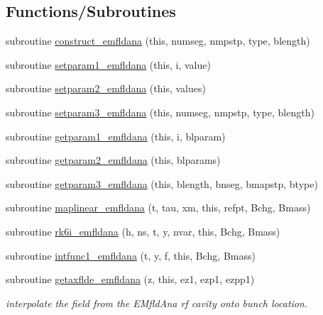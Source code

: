 \subsection*{Functions/\+Subroutines}
\begin{DoxyCompactItemize}
\item 
subroutine \mbox{\hyperlink{namespaceemfldanaclass_a56809546255dc4d8ef545de43f8ced80}{construct\+\_\+emfldana}} (this, numseg, nmpstp, type, blength)
\item 
subroutine \mbox{\hyperlink{namespaceemfldanaclass_acef322ec41908ed27c9dc0f7fe9f4c1c}{setparam1\+\_\+emfldana}} (this, i, value)
\item 
subroutine \mbox{\hyperlink{namespaceemfldanaclass_aac0a3936b2e95e4a86fee5277907646e}{setparam2\+\_\+emfldana}} (this, values)
\item 
subroutine \mbox{\hyperlink{namespaceemfldanaclass_aad90f0dd7002f12e7a5ba004dfb37635}{setparam3\+\_\+emfldana}} (this, numseg, nmpstp, type, blength)
\item 
subroutine \mbox{\hyperlink{namespaceemfldanaclass_ae345ffd1b3393ca091f8cdf3409e3088}{getparam1\+\_\+emfldana}} (this, i, blparam)
\item 
subroutine \mbox{\hyperlink{namespaceemfldanaclass_ae0015cdb617a1920e47dbc2274fb77b2}{getparam2\+\_\+emfldana}} (this, blparams)
\item 
subroutine \mbox{\hyperlink{namespaceemfldanaclass_a67575d528d7993efafb802f4c346d6c0}{getparam3\+\_\+emfldana}} (this, blength, bnseg, bmapstp, btype)
\item 
subroutine \mbox{\hyperlink{namespaceemfldanaclass_aabcc1ab7e5ac19f07fba4e38cfe24b04}{maplinear\+\_\+emfldana}} (t, tau, xm, this, refpt, Bchg, Bmass)
\item 
subroutine \mbox{\hyperlink{namespaceemfldanaclass_aed1f8dea5d7871c10eb2835b204dd581}{rk6i\+\_\+emfldana}} (h, ns, t, y, nvar, this, Bchg, Bmass)
\item 
subroutine \mbox{\hyperlink{namespaceemfldanaclass_aeab0c2abbaa5f527784ce7006d3b4d58}{intfunc1\+\_\+emfldana}} (t, y, f, this, Bchg, Bmass)
\item 
subroutine \mbox{\hyperlink{namespaceemfldanaclass_a4f3936b925964dccc4f9911bcf93c2d7}{getaxflde\+\_\+emfldana}} (z, this, ez1, ezp1, ezpp1)
\begin{DoxyCompactList}\small\item\em interpolate the field from the E\+Mfld\+Ana rf cavity onto bunch location. \end{DoxyCompactList}\item 

\end{DoxyCompactItemize}
